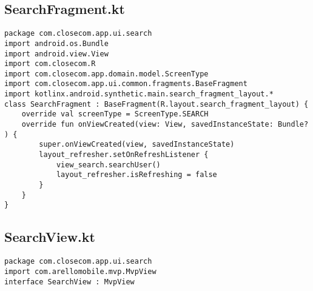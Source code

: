 \documentclass[listing]{espd}
\begin{document}
\subsection{SearchFragment.kt}
\begin{verbatim}
package com.closecom.app.ui.search
import android.os.Bundle
import android.view.View
import com.closecom.R
import com.closecom.app.domain.model.ScreenType
import com.closecom.app.ui.common.fragments.BaseFragment
import kotlinx.android.synthetic.main.search_fragment_layout.*
class SearchFragment : BaseFragment(R.layout.search_fragment_layout) {
    override val screenType = ScreenType.SEARCH
    override fun onViewCreated(view: View, savedInstanceState: Bundle?
) {
        super.onViewCreated(view, savedInstanceState)
        layout_refresher.setOnRefreshListener {
            view_search.searchUser()
            layout_refresher.isRefreshing = false
        }
    }
}
\end{verbatim}

\subsection{SearchView.kt}
\begin{verbatim}
package com.closecom.app.ui.search
import com.arellomobile.mvp.MvpView
interface SearchView : MvpView
\end{verbatim}
\end{document}
